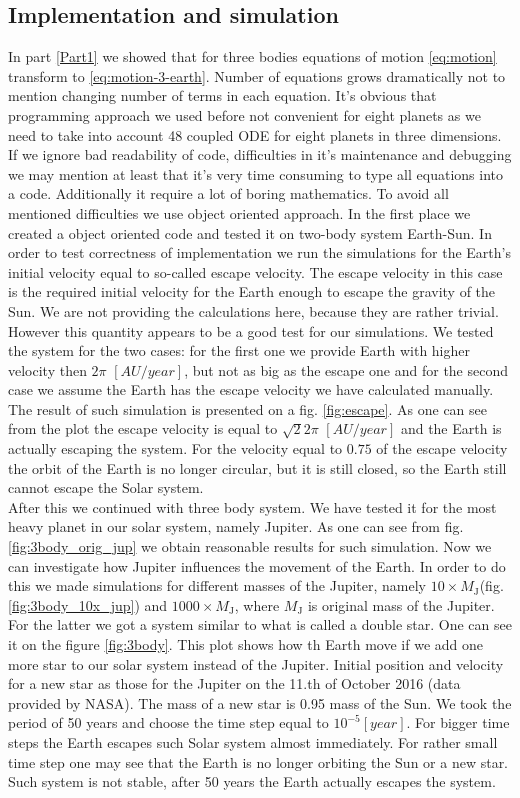 \documentclass[10pt]{article}
\begin{document}
\newpage
\subsection{Implementation and simulation}
In part \ref{Part1} we showed that for three bodies equations of motion \ref{eq:motion} transform to \ref{eq:motion-3-earth}. Number of equations grows dramatically not to mention changing number of terms in each equation. It's obvious that programming approach we used before not convenient for eight planets as we need to take into account 48 coupled ODE for eight planets in three dimensions.
If we ignore bad readability of code, difficulties in it's maintenance and debugging we may mention at least that it's very time consuming to type all equations into a code. Additionally it require a lot of boring mathematics. To avoid all mentioned difficulties we use object oriented approach. In the first place we created a object oriented code and tested it on two-body system Earth-Sun. In order to test correctness of implementation we run the simulations for the Earth's initial velocity equal to so-called escape velocity. The escape velocity in this case is the required initial velocity for the Earth enough to escape the gravity of the Sun. We are not providing the calculations here, because they are rather trivial. However this quantity appears to be a good test for our simulations. We tested the system for the two cases: for the first one we provide Earth with higher velocity then $2\pi$ $[AU/year]$, but not as big as the escape one and for the second case we assume the Earth has the escape velocity we have calculated manually. The result of such simulation is presented on a fig. \ref{fig:escape}. As one can see from the plot the escape velocity is equal to $\sqrt{2}2\pi $ $[AU/year]$ and the Earth is actually escaping the system. For the velocity equal to $0.75$ of the escape velocity the orbit of the Earth is no longer circular, but it is still closed, so the Earth still cannot escape the Solar system.\\
After this we continued with three body system. We have tested it for the most heavy planet in our solar system, namely Jupiter. As one can see from fig. \ref{fig:3body_orig_jup} we obtain reasonable results for such simulation. Now we can investigate how Jupiter influences the movement of the Earth. In order to do this we made simulations for different masses of the Jupiter, namely $10\times M_{\mathrm{J}}$(fig. \ref{fig:3body_10x_jup}) and $1000\times M_{\mathrm{J}}$, where $M_{\mathrm{J}}$ is original mass of the Jupiter. For the latter we got a system similar to what is called a double star. One can see it on the figure \ref{fig:3body}. This plot shows how th Earth move if we add one more star to our solar system instead of the Jupiter. Initial position and velocity for a new star as those for the Jupiter on the 11.th of October 2016 (data provided by NASA\cite{three}). The mass of a new star is 0.95 mass of the Sun. We took the period of 50 years and choose the time step equal to $10^{-5} [year]$. For bigger time steps the Earth escapes such Solar system almost immediately. For rather small time step one may see that the Earth is no longer orbiting the Sun or a new star. Such system is not stable, after 50 years the Earth actually escapes the system.
\end{document}

